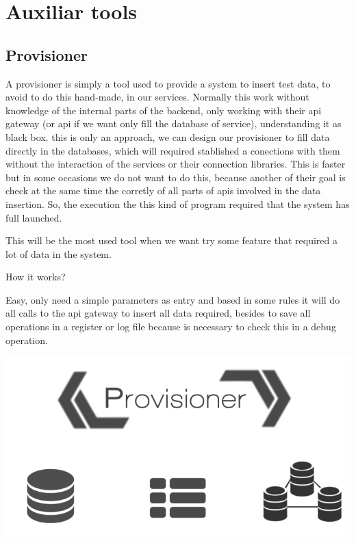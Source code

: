 \section{Auxiliar tools}


\subsection{Provisioner}

A provisioner is simply a tool used to provide a system to insert test data, to avoid to do this hand-made, in our services. Normally this work without knowledge of the internal parts of the backend, only working with their api gateway (or api if we want only fill the database of service), understanding it as black box.
this is only an approach, we can design our provisioner to fill data directly in the databases, which will required stablished a conections with them without the interaction of the services or their connection libraries. This is faster but in some occasions we do not want to do this, because another of their goal is check at the same time the corretly of all parts of apis involved in the data insertion.
So, the execution the this kind of program required that the system has full launched.

This will be the most used tool when we want try some feature that required a lot of data in the system.

How it works?

Easy, only need a simple parameters as entry and based in some rules it will do all calls to the api gateway to insert all data required, besides to save all operations in a register or log file because is necessary to check this in a debug operation.

\begin{center}
\includegraphics[scale=0.4]{img/graphics/provisioner.png}
\end{center}
